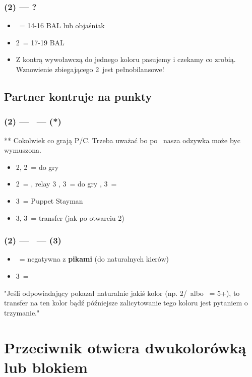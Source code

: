 \documentclass[12pt, a4paper]{article}
\begin{document}
\subsubsection*{(2\diams*) --- ?}
\begin{itemize}
    \item \dbl\ = 14-16 BAL lub objaśniak \vimp
    \item 2\nt\ = 17-19 BAL
    \br
    \item Z kontrą wywoławczą do jednego koloru pasujemy i czekamy co zrobią.
    Wznowienie zbiegającego 2\hearts\ jest pełnobilansowe!
\end{itemize}

\subsection*{Partner kontruje na punkty \vimp} 
\subsubsection*{(2\diams*) --- \dbl\ --- (\rdbl**)}
** Cokolwiek co grają P/C. Trzeba uważać bo po \pass\ nasza odzywka może byc wymuszona.
\begin{itemize}
    \item 2\hearts, 2\spades\ = do gry
    \item 2\nt\ = \leb, relay 3\clubs
    \subitem \pass, 3\diams\ = do gry
    \hearts, 3\spades\ = \inv
    \item 3\clubs\ = Puppet Stayman \imp
    \item 3\diams, 3\hearts\ = transfer (jak po otwarciu 2\nt)
\end{itemize}

\subsubsection*{(2\diams*) --- \dbl\ --- (3\hearts)}
\begin{itemize}
    \item \dbl\ = negatywna z \textbf{pikami} (do naturalnych kierów)
    \item 3\spades\ = \gf
\end{itemize}

"Jeśli odpowiadający pokazał naturalnie jakiś kolor (np. 2\hearts/\spades\ albo \pass\ = 5+\diams),
 to transfer na ten kolor bądź późniejsze zalicytowanie tego koloru jest pytaniem o trzymanie."


 \pagebreak
\section{Przeciwnik otwiera dwukolorówką lub blokiem}
\end{document}
